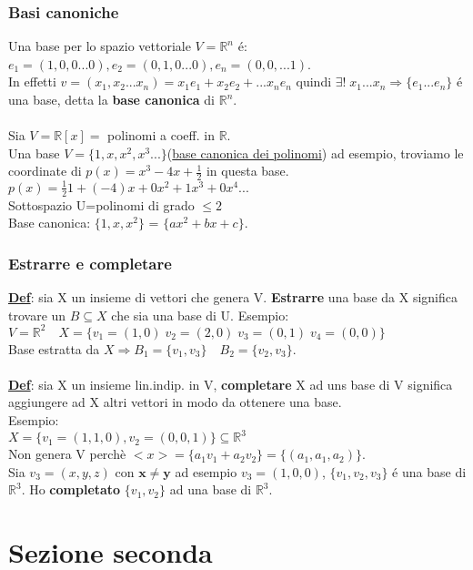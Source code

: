\documentclass[12pt]{article}
\begin{document}
\subsubsection{Basi canoniche}
Una base per lo spazio vettoriale $V = \mathbb{R}^n$ é: $e_1 = (1,0,0...0), e_2 = (0,1,0...0), e_n=(0,0,...1)$.\\ In effetti $v = (x_1,x_2...x_n) = x_1e_1+ x_2e_2 + ...x_ne_n$ quindi $\exists! \;x_1...x_n \Rightarrow \{e_1...e_n\}$ é una base, detta la \textbf{base canonica} di $\mathbb{R}^n$.\\\\
Sia $V = \mathbb{R}[x] = $ polinomi a coeff. in $\mathbb{R}$.\\
Una base $V = \{1,x,x^2,x^3...\}$(\underline{base canonica dei polinomi}) ad esempio, troviamo le coordinate di $p(x) = x^3-4x+\frac{1}{2}$ in questa base.\\
$p(x) = \frac{1}{2}1+(-4)x+0x^2+1x^3+0x^4...$\\
Sottospazio U={polinomi di grado $\leq 2$}\\
Base canonica: $\{1,x,x^2\}$ = $\{ax^2+bx+c\}$.
\subsubsection{Estrarre e completare}
\textbf{\underline{Def}}: sia X un insieme di vettori che genera V. \textbf{Estrarre} una base da X significa trovare un $B \subseteq{X}$ che sia una base di U.
Esempio:\\
$V = \mathbb{R}^2 \quad X = \{v_1 =(1,0)\; v_2=(2,0)\;v_3=(0,1)\;v_4=(0,0)\}$\\
Base estratta da $X \Rightarrow B_1=\{v_1,v_3\} \quad B_2=\{v_2,v_3\}$.\\\\
\textbf{\underline{Def}}: sia X un insieme lin.indip. in V, \textbf{completare} X ad uns base di V significa aggiungere ad X altri vettori in modo da ottenere una base.\\
Esempio:\\ $X = \{v_1 = (1,1,0), v_2 = (0,0,1)\} \subseteq \mathbb{R}^3$\\
Non genera V perchè $<x> = \{a_1v_1+a_2v_2\} = \{(a_1,a_1,a_2)\}$.\\
Sia $v_3 = (x,y,z)$ con $\boldsymbol{x \neq y}$ ad esempio $v_3 = (1,0,0)$, $\{v_1,v_2,v_3\}$ é una base di $\mathbb{R}^3$. Ho \textbf{completato} $\{v_1,v_2\}$ ad una base di $\mathbb{R}^3$.
\section{Sezione seconda}
\end{document}
